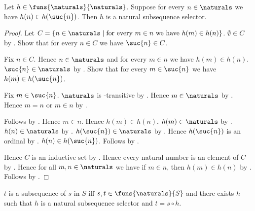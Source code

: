 \begin{theorem}\label{natural_subsequence_selector_from_successors}
    Let $h\in\funs{\naturals}{\naturals}$.
    Suppose for every $n\in\naturals$ we have
        $h(n)\in h(\suc{n})$.
    Then $h$ is a natural subsequence selector.
\end{theorem}
\begin{proof}
    Let $C=\{n\in\naturals\mid
        \text{for every $m\in n$ we have $h(m)\in h(n)$}\}$.
    $\emptyset\in C$ by .
    Show that for every $n\in C$ we have $\suc{n}\in C$.
    \begin{subproof}
        Fix $n\in C$.
        Hence $n\in\naturals$ and for every $m\in n$ we have
            $h(m)\in h(n)$.
        $\suc{n}\in\naturals$ by .
        Show that for every $m\in\suc{n}$ we have
            $h(m)\in h(\suc{n})$.
        \begin{subproof}
            Fix $m\in\suc{n}$.
            $\naturals$ is \in-transitive by
                .
            Hence $m\in\naturals$ by
                .
            Hence $m=n$ or $m\in n$ by .
            \begin{byCase}
                    Follows by \auto.
                    Hence $m\in n$.
                    Hence $h(m)\in h(n)$.
                    $h(m)\in\naturals$ by .
                    $h(n)\in\naturals$ by .
                    $h(\suc{n})\in\naturals$ by
                        .
                    Hence $h(\suc{n})$ is an ordinal by
                        .
                    $h(n)\in h(\suc{n})$.
                    Follows by .
            \end{byCase}
        \end{subproof}
    \end{subproof}
    Hence $C$ is an inductive set by .
    Hence every natural number is an element of $C$ by
        .
    Hence for all $m,n\in\naturals$ we have if $m\in n$, then
        $h(m)\in h(n)$ by \auto.
    Follows by .
\end{proof}

\begin{definition}\label{subsequence}
    $t$ is a subsequence of $s$ in $S$ iff
        $s,t\in\funs{\naturals}{S}$ and there exists $h$ such that
            $h$ is a natural subsequence selector and $t=s\circ h$.
\end{definition}

